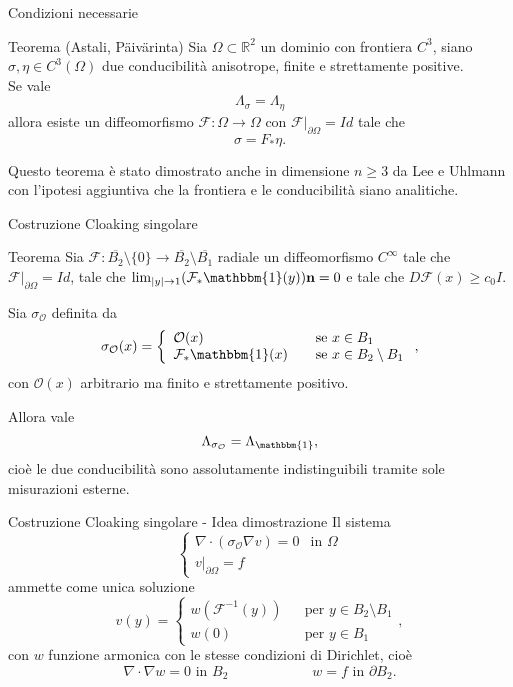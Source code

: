 \documentclass{beamer}
\newcommand{\bbR}{\mathbb{R}}
\newcommand{\de}{\partial}
\newcommand{\OO}{\mathcal{O}}
\newcommand{\F}{\mathcal{F}}
\newcommand{\1}{\mathbbm{1}}
\begin{document}
\begin{frame}{Condizioni necessarie}
\pause
\begin{block}{Teorema (Astali, Päivärinta)}
Sia $\Omega\subset\bbR^2$ un dominio con frontiera $C^3$, siano $\sigma, \eta \in C^3(\Omega)$ due conducibilità anisotrope, finite e strettamente positive.\\ \pause
Se vale
\[
\Lambda_{\sigma} = \Lambda_{\eta}
\]
allora esiste un diffeomorfismo $\F:\Omega\rightarrow\Omega$ con $\F|_{\de\Omega}=Id$ tale che
\[
\sigma=F_*\eta.
\]
\end{block}
\pause
Questo teorema è stato dimostrato anche in dimensione $n\geq3$ da Lee e Uhlmann con l'ipotesi aggiuntiva che la frontiera e le conducibilità siano analitiche.
\end{frame}


\begin{frame}{Costruzione Cloaking singolare}
\begin{block}{Teorema}
Sia $\F: \overline{B_2}\setminus\{0\} \rightarrow  \overline{B_2}\setminus \overline{B_1}$ radiale un diffeomorfismo $C^\infty$ tale che $\F|_{\de\Omega}=Id$, tale che $\lim_{|y|\rightarrow1} (\F_*\mathbbm{1}(y))\textbf{n} = 0$ e tale che $D\F(x)\geq c_0I$.\pause

Sia $\sigma_\OO$ definita da
\[
\sigma_\OO(x) = 
	\left\{\begin{array}{lll}
         \OO(x) & & \text{se } x\in B_1 \\
         \F_*\1(x) & & \text{se } x\in B_2\setminus B_1
    \end{array}\right.,
\]
con $\OO(x)$ arbitrario ma finito e strettamente positivo.\pause

Allora vale
\[ \Lambda_{\sigma_\OO} = \Lambda_\1 ,\]
cioè le due conducibilità sono assolutamente indistinguibili tramite sole misurazioni esterne.
\end{block}
\end{frame}


\begin{frame}{Costruzione Cloaking singolare - Idea dimostrazione}
\pause
Il sistema
\begin{equation*}
\left\{ \begin{array}{ll}
         \nabla\cdot(\sigma_\OO\nabla v)=0 & \text{in } \Omega \\
         v|_{\de\Omega}=f
    \end{array}
\right.
\end{equation*}
\pause
ammette come unica soluzione
\begin{equation*}
v(y) = 
	\left\{\begin{array}{lll}
         w(\F^{-1}(y)) & & \text{per } y\in B_2\setminus B_1 \\
         w(0) & & \text{per } y\in B_1
    \end{array}\right.,
\end{equation*}
con $w$ funzione armonica con le stesse condizioni di Dirichlet, cioè
\[
\nabla\cdot\nabla w=0 \text{ in }B_2 
\qquad
\qquad
\qquad
w=f \text{ in }\de B_2.
\]
\end{frame}
\end{document}
